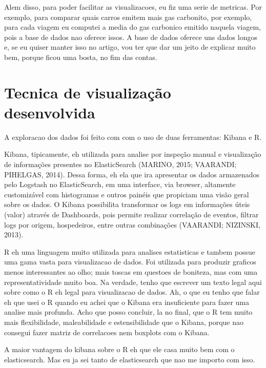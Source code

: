 \documentclass[10pt, conference]{IEEEtran}
\begin{document}
Alem disso, para poder facilitar as visualizacoes, eu fiz uma serie de metricas. Por exemplo, 
para comparar quais carros emitem mais gas carbonito, por exemplo, para cada viagem eu computei
a media do gas carbonico emitido naquela viagem, pois a base de dados nao oferece issos. A base de
dados oferece uns dados longos e, se eu quiser manter isso no artigo, vou ter que dar
um jeito de explicar muito bem, porque ficou uma bosta, no fim das contas.



\section{Tecnica de visualização desenvolvida}
\label{sec:technique}
%
A exploracao dos dados foi feito com com o uso de duas ferramentas: Kibana e R.

Kibana, tipicamente, eh utilizada para analise por inspeção manual e visualização 
de informações presentes no
ElasticSearch (MARINO,  2015;  VAARANDI;  PIHELGAS,  2014).   Dessa  forma,  eh  ela  que
ira apresentar os dados armazenados pelo Logstash no ElasticSearch, em uma interface,  via
browser, altamente customizável com histogramas e outros painéis que propiciam uma visão
geral sobre os dados.  O Kibana possibilita transformar os logs em informações úteis (valor)
através  de Dashboards,  pois  permite  realizar  correlação  de  eventos,  filtrar logs
por  origem, hospedeiros, entre outras combinações (VAARANDI; NIZINSKI, 2013).

R eh uma linguagem muito utilizada para analises estatisticas e tambem possue uma gama
vasta para visualizacao de dados. Foi utilizada para produzir graficos menos interessantes
ao olho; mais toscas em questoes de boniteza, mas com uma representatividade muito boa.
Na verdade, tenho que escrever um texto legal aqui sobre como o R eh legal para visualizacao
de dados. Ah, o que eu tenho que falar eh que usei o R quando eu achei que o Kibana era 
insuficiente para fazer uma analise mais profunda. Acho que posso concluir, la no final,
que o R tem muito mais flexibilidade, maleabilidade e estensibilidade que o Kibana, porque
nao consegui fazer matriz de correlacoes nem boxplots com o Kibana.

A maior vantagem do kibana sobre o R eh que ele casa muito bem com o elasticsearch. Mas
eu ja sei tanto de elasticsearch que nao me importo com isso.


\end{document}
